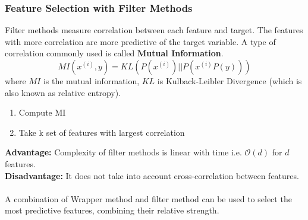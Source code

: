 \documentclass[12pt,a4paper,titlepage,landscape]{book}
\begin{document}
	\subsubsection{Feature Selection with Filter Methods}
	Filter methods measure correlation between each feature and target. The features with more correlation are more predictive of the target variable. A type of correlation commonly used is called \textbf{Mutual Information}.
	$$MI(x^{(i)},y) = KL\left(P\left(x^{(i)}\right) || P\left(x^{(i)}P(y)\right)\right)$$
	where $MI$ is the mutual information, $KL$ is Kulback-Leibler Divergence (which is also known as relative entropy).
	
	\begin{enumerate}
		\item Compute MI
		\item Take k set of features with largest correlation
	\end{enumerate} 
	\textbf{Advantage: }Complexity of filter methods is linear with time i.e. $\mathcal{O}(d)$ for $d$ features. \\
	\textbf{Disadvantage: }It does not take into account cross-correlation between features. \\\\
	A combination of Wrapper method and filter method can be used to select the most predictive features, combining their relative strength.
	
	
	
	
	
	
	
\end{document}
